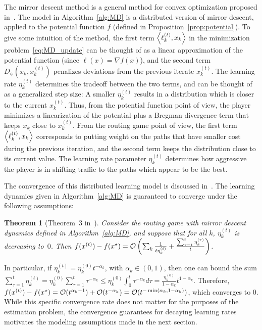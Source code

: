 \documentclass{sig-alternate-ipsn13}
\newtheorem{theorem}{Theorem}
\begin{document}
The mirror descent method is a general method for convex optimization proposed in~\cite{nemirovski1983problem}. The model in Algorithm~\ref{alg:MD} is a distributed version of mirror descent, applied to the potential function $f$ (defined in Proposition~\ref{prop:potential}). To give some intuition of the method, the first term $\left\langle \ell_k^{(t)}, x_k \right\rangle$ in the minimization problem~\eqref{eq:MD_update} can be thought of as a linear approximation of the potential function (since $\ell(x) = \nabla f(x)$), and the second term $D_\psi(x_k, x^{(t)}_k)$ penalizes deviations from the previous iterate $x_k^{(t)}$. The learning rate $\eta_k^{(t)}$ determines the tradeoff between the two terms, and can be thought of as a generalized step size: A smaller $\eta_k^{(t)}$ results in a distribution which is closer to the current $x_k^{(t)}$. Thus, from the potential function point of view, the player minimizes a linearization of the potential plus a Bregman divergence term that keeps $x_k$ close to $x_k^{(t)}$. From the routing game point of view, the first term $\left\langle \ell^{(t)}_k, x_k \right\rangle$ corresponds to putting weight on the paths that have smaller cost during the previous iteration, and the second term keeps the distribution close to its current value. The learning rate parameter $\eta^{(t)}_k$ determines how aggressive the player is in shifting traffic to the paths which appear to be the best.

The convergence of this distributed learning model is discussed in~\cite{krichene2015MD}. The learning dynamics given in Algorithm~\ref{alg:MD} is guaranteed to converge under the following assumptions:
\begin{theorem}[Theorem~3 in~\cite{krichene2015MD}]
\label{thm:convergence}
Consider the routing game with mirror descent dynamics defined in Algorithm~\ref{alg:MD}, and suppose that for all $k$, $\eta_k^{(t)}$ is decreasing to~$0$. Then $f(x^{(t)}) - f(x^\star) = \mathcal{O}\left( \sum_k \frac{1}{t\eta_k^{(t)}} + \frac{\sum_{\tau = 1}^t \eta_k^{(\tau)}}{t}  \right)$.
\end{theorem}

In particular, if $\eta_k^{(t)} = \eta^{(0)}_k t^{-\alpha_k}$, with $\alpha_k \in (0, 1)$, then one can bound the sum $\sum_{\tau = 1}^t \eta_k^{(t)} = \eta^{(0)}_k \sum_{\tau = 1}^t \tau^{-\alpha_k} \leq \eta^{(0)}_k \int_0^t \tau^{-\alpha_k} d\tau = \frac{\eta^{(0)}_k}{1-\alpha_k} t^{1-\alpha_k}$. Therefore, $f(x^{(t)}) - f(x^\star) = \mathcal{O}(t^{\alpha_k - 1}) + \mathcal{O}(t^{-\alpha_k}) = \mathcal{O}(t^{-\min(\alpha_k, 1-\alpha_k)})$, which converges to $0$. While this specific convergence rate does not matter for the purposes of the estimation problem, the convergence guarantees for decaying learning rates motivates the modeling assumptions made in the next section.
\end{document}

